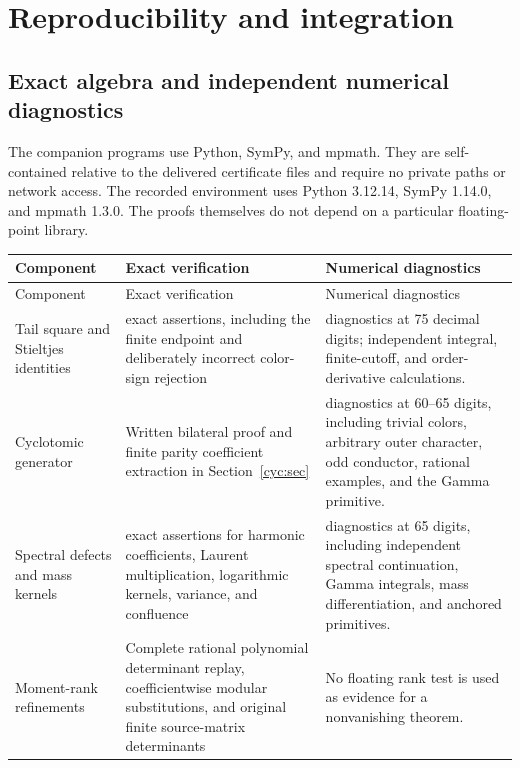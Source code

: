 \documentclass[11pt,a4paper]{article}
\numberwithin{equation}{section}
\theoremstyle{definition}
\theoremstyle{remark}
\begin{document}

\clearpage
\section{Reproducibility and integration}
\label{verify:section}

\subsection{Exact algebra and independent numerical diagnostics}

The companion programs use Python, SymPy, and mpmath. They are
self-contained relative to the delivered certificate files and require
no private paths or network access. The recorded environment uses
Python 3.12.14, SymPy 1.14.0, and mpmath 1.3.0. The proofs themselves
do not depend on a particular floating-point library.

\begin{longtable}{@{}>{\raggedright\arraybackslash}p{}>{\raggedright\arraybackslash}p{}>{\raggedright\arraybackslash}p{}@{}}
\toprule
Component & Exact verification & Numerical diagnostics\\
\midrule
\endfirsthead
\toprule Component & Exact verification & Numerical diagnostics\\\midrule
\endhead
Tail square and Stieltjes identities & 96 exact assertions, including
the finite endpoint and deliberately incorrect color-sign rejection &
29 diagnostics at 75 decimal digits; independent integral, finite-cutoff,
and order-derivative calculations.\\[5pt]
Cyclotomic generator & Written bilateral proof and finite parity
coefficient extraction in Section~\ref{cyc:sec} & 12 diagnostics at
60--65 digits, including trivial colors, arbitrary outer character,
odd conductor, rational examples, and the Gamma primitive.\\[5pt]
Spectral defects and mass kernels & 194 exact assertions for harmonic
coefficients, Laurent multiplication, logarithmic kernels, variance,
and confluence & 21 diagnostics at 65 digits, including independent
spectral continuation, Gamma integrals, mass differentiation, and
anchored primitives.\\[5pt]
Moment-rank refinements & Complete rational polynomial determinant
replay, coefficientwise modular substitutions, and original finite
source-matrix determinants & No floating rank test is used as evidence
for a nonvanishing theorem.\\
\bottomrule
\end{longtable}
\end{document}
